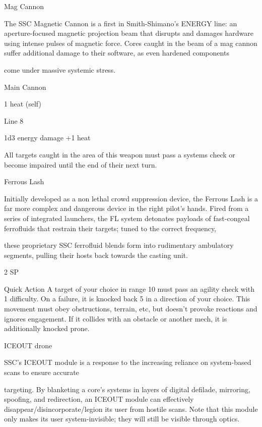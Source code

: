 Mag Cannon  

The SSC Magnetic Cannon is a first in Smith-Shimano’s ENERGY line: an aperture-focused magnetic  
projection beam that disrupts and damages hardware using intense pulses of magnetic force. Cores caught  
in the beam of a mag cannon suffer additional damage to their software, as even hardened components  

come under massive systemic stress.   

Main Cannon
 
1 heat (self)
 
Line 8
 
1d3 energy damage +1 heat
 
All targets caught in the area of this weapon must pass a systems check or become impaired  
until the end of their next turn.
 

Ferrous Lash  

Initially developed as a non lethal crowd suppression device, the Ferrous Lash is a far more complex and  
dangerous device in the right pilot’s hands. Fired from a series of integrated launchers, the FL system  
detonates payloads of fast-congeal ferrofluids that restrain their targets; tuned to the correct frequency,  

these proprietary SSC ferrofluid blends form into rudimentary ambulatory segments, pulling their hosts  
back towards the casting unit.   

2 SP  

                                                                                                                          


Quick Action  
A target of your choice in range 10 must pass an agility check with 1 difficulty. On a failure, it is  
knocked back 5 in a direction of your choice. This movement must obey obstructions, terrain,  
etc, but doesn't provoke reactions and ignores engagement. If it collides with an obstacle or  
another mech, it is additionally knocked prone.
 

ICEOUT drone  

SSC’s ICEOUT module is a response to the increasing reliance on system-based scans to ensure accurate  

targeting. By blanketing a core’s systems in layers of digital defilade, mirroring, spoofing, and redirection,  
an ICEOUT module can effectively disappear/disincorporate/legion its user from hostile scans. Note that  
this module only makes its user system-invisible; they will still be visible through optics.    

